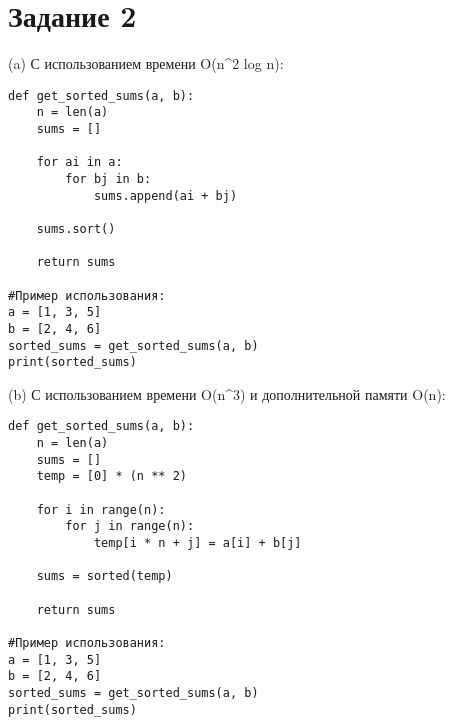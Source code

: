 
\section*{Задание 2}

(a) С использованием времени O(n^2 log n):

\begin{verbatim}
def get_sorted_sums(a, b):
    n = len(a)
    sums = []
    
    for ai in a:
        for bj in b:
            sums.append(ai + bj)
    
    sums.sort()
    
    return sums
            
#Пример использования:
a = [1, 3, 5]
b = [2, 4, 6]
sorted_sums = get_sorted_sums(a, b)
print(sorted_sums)
\end{verbatim}


(b) С использованием времени O(n^3) и дополнительной памяти O(n):

\begin{verbatim}
def get_sorted_sums(a, b):
    n = len(a)
    sums = []
    temp = [0] * (n ** 2)
    
    for i in range(n):
        for j in range(n):
            temp[i * n + j] = a[i] + b[j]
    
    sums = sorted(temp)
    
    return sums
            
#Пример использования:
a = [1, 3, 5]
b = [2, 4, 6]
sorted_sums = get_sorted_sums(a, b)
print(sorted_sums)
\end{verbatim}